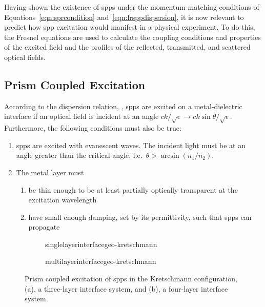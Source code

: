 Having shown the existence of \glspl{spp} under the momentum-matching conditions
of Equations~\ref{eqn:sprcondition} and~\ref{eqn:lrsppdispersion}, it is
now relevant to predict how \gls{spp} excitation would manifest in a physical
experiment.  To do this, the Fresnel equations are used to calculate the
coupling conditions and properties of the excited field and the profiles of
the reflected, transmitted, and scattered optical fields.

\subsection{Prism Coupled Excitation}
According to the dispersion relation, , \glspl{spp} are
excited on a metal-dielectric interface if an optical field is incident at
an angle $ck/\sqrt{\epsilon} \to ck\sin\theta/\sqrt{\epsilon}$.
Furthermore, the following conditions must also be true:
\begin{enumerate}
\item \glspl{spp} are excited with evanescent waves.  The
incident light must be at an angle greater than the critical angle, i.e.\
$\theta>\arcsin\left(n_1/n_2\right)$.
\item The metal layer must
\begin{enumerate}
\item be thin enough to be at least partially optically transparent at the excitation wavelength
\item have small enough damping, set by its permittivity, such that \glspl{spp} can propagate
\end{enumerate}
\end{enumerate}

\begin{figure}[ht]
 \centering
 \begin{subfigure}[b]{0.4\textwidth}
  \centering
  {singlelayerinterfacegeo-kretschmann}
  \caption{}
 \end{subfigure}
 \begin{subfigure}[b]{0.4\textwidth}
  {multilayerinterfacegeo-kretschmann}
  \caption{}
 \end{subfigure}
\caption{Prism coupled excitation of \glspl{spp} in the Kretschmann configuration,
(a), a three-layer interface system, and (b), a four-layer interface system. }
\label{fig:prismcoupledsetups}
\end{figure}

